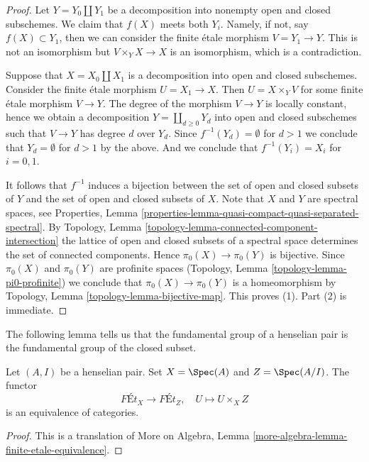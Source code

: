 \begin{proof}
Let $Y = Y_0 \amalg Y_1$ be a decomposition into nonempty open and closed
subschemes. We claim that $f(X)$ meets both $Y_i$. Namely, if not,
say $f(X) \subset Y_1$, then we can consider the finite \'etale
morphism $V = Y_1 \to Y$. This is not an
isomorphism but $V \times_Y X \to X$ is an isomorphism, which is
a contradiction.

\medskip\noindent
Suppose that $X = X_0 \amalg X_1$ is a decomposition into open and closed
subschemes. Consider the finite \'etale morphism $U = X_1 \to X$. Then
$U = X \times_Y V$ for some finite \'etale morphism $V \to Y$. The degree
of the morphism $V \to Y$ is locally constant, hence we obtain a decomposition
$Y = \coprod_{d \geq 0} Y_d$ into open and closed subschemes
such that $V \to Y$ has degree $d$ over $Y_d$. Since
$f^{-1}(Y_d) = \emptyset$ for $d > 1$ we conclude that $Y_d = \emptyset$
for $d > 1$ by the above. And we conclude that $f^{-1}(Y_i) = X_i$
for $i = 0, 1$.

\medskip\noindent
It follows that $f^{-1}$ induces a bijection between the set of
open and closed subsets of $Y$ and the set of open and closed subsets of $X$.
Note that $X$ and $Y$ are spectral spaces, see Properties, Lemma
\ref{properties-lemma-quasi-compact-quasi-separated-spectral}.
By Topology, Lemma \ref{topology-lemma-connected-component-intersection}
the lattice of open and closed subsets of a spectral space
determines the set of connected components.
Hence $\pi_0(X) \to \pi_0(Y)$ is bijective. Since $\pi_0(X)$ and
$\pi_0(Y)$ are profinite spaces
(Topology, Lemma \ref{topology-lemma-pi0-profinite})
we conclude that $\pi_0(X) \to \pi_0(Y)$ is a homeomorphism by
Topology, Lemma \ref{topology-lemma-bijective-map}. This proves (1).
Part (2) is immediate.
\end{proof}

\noindent
The following lemma tells us that the fundamental group of a henselian
pair is the fundamental group of the closed subset.

\begin{lemma}
\label{lemma-gabber}
Let $(A, I)$ be a henselian pair. Set $X = \Spec(A)$ and $Z = \Spec(A/I)$.
The functor
$$
\textit{F\'Et}_X \longrightarrow \textit{F\'Et}_Z,\quad
U \longmapsto U \times_X Z
$$
is an equivalence of categories.
\end{lemma}

\begin{proof}
This is a translation of
More on Algebra, Lemma \ref{more-algebra-lemma-finite-etale-equivalence}.
\end{proof}

